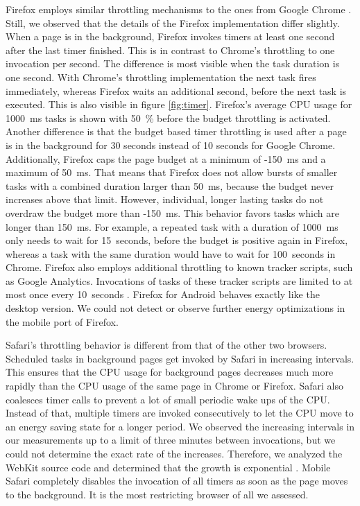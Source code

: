 \documentclass[
	ruledheaders=section,%
	class=report,%
	thesis={type=bachelor},%
	accentcolor=9c,%
	custommargins=true,%
	marginpar=false,%
	parskip=half-,%
	fontsize=11pt,%
]{tudapub}
\begin{document}
  Firefox employs similar throttling mechanisms to the ones from Google Chrome \cite{mdn-page-visibility}. Still, we observed that the details of the Firefox implementation differ slightly. When a page is in the background, Firefox invokes timers at least one second after the last timer finished. This is in contrast to Chrome's throttling to one invocation per second. The difference is most visible when the task duration is one second. With Chrome's throttling implementation the next task fires immediately, whereas Firefox waits an additional second, before the next task is executed. This is also visible in figure \ref{fig:timer}. Firefox's average CPU usage for 1000~ms tasks is shown with 50~\% before the budget throttling is activated. Another difference is that the budget based timer throttling is used after a page is in the background for 30 seconds instead of 10 seconds for Google Chrome. Additionally, Firefox caps the page budget at a minimum of -150~ms and a maximum of 50~ms. That means that Firefox does not allow bursts of smaller tasks with a combined duration larger than 50~ms, because the budget never increases above that limit. However, individual, longer lasting tasks do not overdraw the budget more than -150~ms. This behavior favors tasks which are longer than 150~ms. For example, a repeated task with a duration of 1000~ms only needs to wait for 15~seconds, before the budget is positive again in Firefox, whereas a task with the same duration would have to wait for 100~seconds in  Chrome. Firefox also employs additional throttling to known tracker scripts, such as Google Analytics. Invocations of tasks of these tracker scripts are limited to at most once every 10~seconds \cite{mdn-tracker-throttling}. Firefox for Android behaves exactly like the desktop version. We could not detect or observe further energy optimizations in the mobile port of Firefox. 

  Safari's throttling behavior is different from that of the other two browsers. Scheduled tasks in background pages get invoked by Safari in increasing intervals. This ensures that the CPU usage for background pages decreases much more rapidly than the CPU usage of the same page in Chrome or Firefox. Safari also coalesces timer calls to prevent a lot of small periodic wake ups of the CPU. Instead of that, multiple timers are invoked consecutively to let the CPU move to an energy saving state for a longer period. We observed the increasing intervals in our measurements up to a limit of three minutes between invocations, but we could not determine the exact rate of the increases. Therefore, we analyzed the WebKit source code and determined that the growth is exponential \cite{webkit-timer-increases}. Mobile Safari completely disables the invocation of all timers as soon as the page moves to the background. It is the most restricting browser of all we assessed.
  
\end{document}
